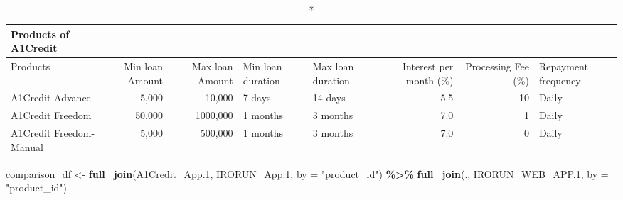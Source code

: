 \documentclass[
]{article}
\newenvironment{Shaded}{\begin{snugshade}}{\end{snugshade}}
\newcommand{\AttributeTok}[1]{\textcolor[rgb]{0.13,0.29,0.53}{#1}}
\newcommand{\FloatTok}[1]{\textcolor[rgb]{0.00,0.00,0.81}{#1}}
\newcommand{\FunctionTok}[1]{\textcolor[rgb]{0.13,0.29,0.53}{\textbf{#1}}}
\newcommand{\NormalTok}[1]{#1}
\newcommand{\OtherTok}[1]{\textcolor[rgb]{0.56,0.35,0.01}{#1}}
\newcommand{\SpecialCharTok}[1]{\textcolor[rgb]{0.81,0.36,0.00}{\textbf{#1}}}
\newcommand{\StringTok}[1]{\textcolor[rgb]{0.31,0.60,0.02}{#1}}
\begin{document}
\begin{longtable}{lrrllrrl}
\caption*{
{\large Products of A1Credit}
} \\ 
\toprule
Products & Min loan Amount & Max loan Amount & Min loan duration & Max loan duration & Interest per month (\%) & Processing Fee (\%) & Repayment frequency \\ 
\midrule
A1Credit Advance & 5,000 & 10,000 & 7 days & 14 days & 5.5 & 10 & Daily \\ 
A1Credit Freedom & 50,000 & 1000,000 & 1 months & 3 months & 7.0 & 1 & Daily \\ 
A1Credit Freedom-Manual & 5,000 & 500,000 & 1 months & 3 months & 7.0 & 0 & Daily \\ 
\bottomrule
\end{longtable}

\begin{Shaded}
\begin{Highlighting}[]
\NormalTok{comparison\_df }\OtherTok{\textless{}{-}} \FunctionTok{full\_join}\NormalTok{(A1Credit\_App}\FloatTok{.1}\NormalTok{, IRORUN\_App}\FloatTok{.1}\NormalTok{, }\AttributeTok{by =} \StringTok{"product\_id"}\NormalTok{) }\SpecialCharTok{\%\textgreater{}\%}
  \FunctionTok{full\_join}\NormalTok{(., IRORUN\_WEB\_APP}\FloatTok{.1}\NormalTok{, }\AttributeTok{by =} \StringTok{"product\_id"}\NormalTok{)}
\end{Highlighting}
\end{Shaded}
\end{document}
